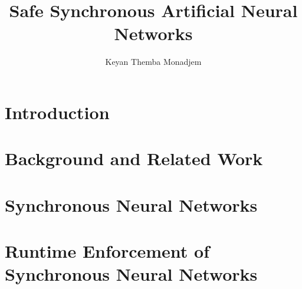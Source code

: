 \documentclass[twoside,a4paper,12pt]{uathesis}
\begin{document}
\title{Safe Synchronous Artificial Neural Networks}
\author{Keyan Themba Monadjem}

\maketitle

\frontmatter
{}




\tableofcontents

\listoffigures

\listoftables

%

\mainmatter



\chapter{Introduction}



\chapter{Background and Related Work}



\chapter{Synchronous Neural Networks}

%









\chapter{Runtime Enforcement of Synchronous Neural Networks}
\end{document}
